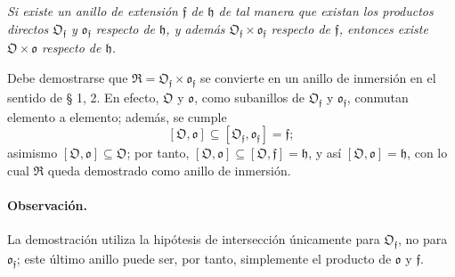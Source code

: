 \emph{Si existe un anillo de extensión $\mathfrak f$ de $\mathfrak h$ de tal manera que existan los productos directos $\mathfrak O_{\mathfrak f}$ y $\mathfrak o_{\mathfrak f}$ respecto de $\mathfrak h$, y además $\mathfrak O_{\mathfrak f}\times\mathfrak o_{\mathfrak f}$ respecto de $\mathfrak f$, entonces existe $\mathfrak O\times\mathfrak o$ respecto de $\mathfrak h$.}

Debe demostrarse que $\mathfrak R=\mathfrak O_{\mathfrak f}\times\mathfrak o_{\mathfrak f}$ se convierte en un anillo de inmersión en el sentido de § 1, 2. En efecto, $\mathfrak O$ y $\mathfrak o$, como subanillos de $\mathfrak O_{\mathfrak f}$ y $\mathfrak o_{\mathfrak f}$, conmutan elemento a elemento; además, se cumple
\[
[\mathfrak O,\mathfrak o]\subseteq[\mathfrak O_{\mathfrak f},\mathfrak o_{\mathfrak f}]=\mathfrak f;
\]
asimismo $[\mathfrak O,\mathfrak o]\subseteq\mathfrak O$; por tanto, $[\mathfrak O,\mathfrak o]\subseteq[\mathfrak O,\mathfrak f]=\mathfrak h$, y así $[\mathfrak O,\mathfrak o]=\mathfrak h$, con lo cual $\mathfrak R$ queda demostrado como anillo de inmersión.

\paragraph{Observación.}
La demostración utiliza la hipótesis de intersección únicamente para $\mathfrak O_{\mathfrak f}$, no para $\mathfrak o_{\mathfrak f}$; este último anillo puede ser, por tanto, simplemente el producto de $\mathfrak o$ y $\mathfrak f$.
